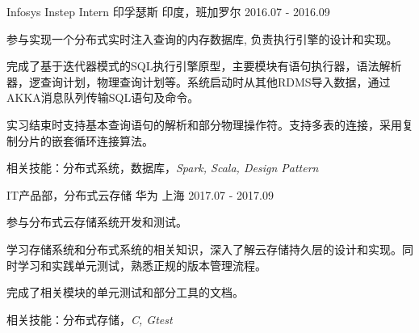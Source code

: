 \begin{cventries}
  \cventry
    {Infosys Instep Intern}
    {印孚瑟斯}
    {印度，班加罗尔}
    {2016.07 - 2016.09}
    {
      \begin{cvitems}
        \item {参与实现一个分布式实时注入查询的内存数据库, 负责执行引擎的设计和实现。}
        \item {完成了基于迭代器模式的SQL执行引擎原型，主要模块有语句执行器，语法解析器，逻查询计划，物理查询计划等。系统启动时从其他RDMS导入数据，通过AKKA消息队列传输SQL语句及命令。}
        \item {实习结束时支持基本查询语句的解析和部分物理操作符。支持多表的连接，采用复制分片的嵌套循环连接算法。}
        \item {相关技能：分布式系统，数据库，\it{Spark, Scala, Design Pattern}}
      \end{cvitems}
    }
  \cventry
    {IT产品部，分布式云存储}
    {华为}
    {上海}
    {2017.07 - 2017.09}
    {
      \begin{cvitems}
        \item {参与分布式云存储系统开发和测试。}
        \item {学习存储系统和分布式系统的相关知识，深入了解云存储持久层的设计和实现。同时学习和实践单元测试，熟悉正规的版本管理流程。}
	\item {完成了相关模块的单元测试和部分工具的文档。}
        \item {相关技能：分布式存储，\it{C, Gtest}}
      \end{cvitems}
    }
\end{cventries}
